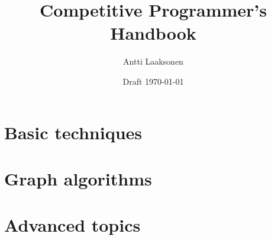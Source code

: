 \documentclass[twoside,12pt,a4paper,english]{book}
\date{Draft \today}
\title{\Huge Competitive Programmer's Handbook}
\author{\Large Antti Laaksonen}
\begin{document}


\frontmatter
\maketitle
\setcounter{tocdepth}{1}
\tableofcontents



\mainmatter
{}
\setcounter{page}{1}

\newcommand{\key}[1] {\textbf{#1}}

\part{Basic techniques}










\part{Graph algorithms}










\part{Advanced topics}











\cleardoublepage
{}
{}


\cleardoublepage
\printindex
\end{document}
